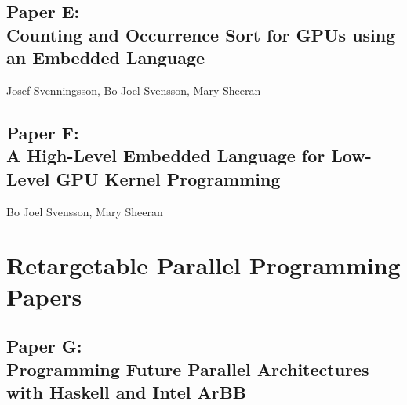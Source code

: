 \documentclass[a4paper]{book}
\newcommand{\paperE}{Paper E}
\newcommand{\paperETitle}{Counting and Occurrence Sort for GPUs using an Embedded Language}
\newcommand{\paperF}{Paper F}
\newcommand{\paperFTitle}{A High-Level Embedded Language for Low-Level GPU Kernel Programming}
\newcommand{\paperG}{Paper G}
\newcommand{\paperGTitle}{Programming Future Parallel Architectures with Haskell and Intel ArBB}
\begin{document}
% 
\cleardoublepage 

\section[\paperETitle]{\paperE: \\ \paperETitle}
\label{sec:paperE}


\begin{center} 
Josef Svenningsson, Bo Joel Svensson, Mary Sheeran 
\end{center}





% 
\cleardoublepage 


\section[\paperFTitle]{\paperF: \\ \paperFTitle}
\label{sec:paperF}


\begin{center} 
Bo Joel Svensson, Mary Sheeran
\end{center}






% 

\chapter{Retargetable Parallel Programming Papers}
\label{chap:ArBB}
% 
\cleardoublepage 


\section[\paperGTitle]{\paperG: \\ \paperGTitle}
\label{sec:paperG}
\end{document}

